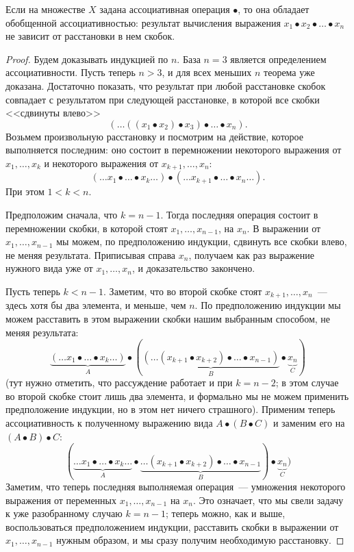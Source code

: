 \begin{theorem}
Если на множестве $X$ задана ассоциативная операция $\bullet$, то она
обладает обобщенной ассоциативностью: результат вычисления выражения
$x_1\bullet x_2\bullet\dots\bullet x_n$ не зависит от расстановки в
нем скобок.
\end{theorem}
\begin{proof}
Будем доказывать индукцией по $n$. База $n=3$ является определением
ассоциативности. Пусть теперь $n>3$, и для всех меньших $n$ теорема
уже доказана.
Достаточно показать, что результат при любой расстановке скобок
совпадает с результатом при следующей расстановке, в которой все скобки
<<сдвинуты влево>>
$$
(\dots ((x_1\bullet x_2)\bullet x_3)\bullet\dots\bullet x_n).
$$
Возьмем произвольную расстановку и посмотрим на действие, которое
выполняется последним: оно состоит в перемножении некоторого выражения
от $x_1,\dots,x_k$ и некоторого выражения от $x_{k+1},\dots,x_n$:
$$
(\dots x_1\bullet\dots\bullet x_k\dots) \bullet
(\dots x_{k+1}\bullet\dots\bullet x_n\dots).
$$
При этом $1 < k < n$.

Предположим сначала, что $k = n-1$. Тогда последняя операция состоит в
перемножении скобки, в которой стоят $x_1,\dots,x_{n-1}$, на $x_n$. В
выражении от $x_1,\dots,x_{n-1}$ мы можем, по предположению индукции,
сдвинуть все скобки влево, не меняя результата. Приписывая справа
$x_n$, получаем как раз выражение нужного вида уже от
$x_1,\dots,x_n$, и доказательство закончено.

Пусть теперь $k<n-1$. Заметим, что во второй скобке стоят
$x_{k+1},\dots,x_n$~--- здесь хотя бы два элемента, и меньше, чем
$n$. По предположению индукции мы можем расставить в этом выражении
скобки нашим выбранным способом, не меняя результата:
$$
\underbrace{\left(\dots x_1\bullet\dots\bullet x_k\dots\right)}_{A} \bullet
(\underbrace{(\dots (x_{k+1}\bullet x_{k+2})\bullet\dots\bullet x_{n-1})}_B\bullet\underbrace{x_n}_C)
$$
(тут нужно отметить, что рассуждение работает и при $k=n-2$; в этом
случае во второй скобке стоит лишь два элемента, и формально мы не
можем применить предположение индукции, но в этом нет ничего страшного).
Применим теперь ассоциативность к полученному выражению вида
$A\bullet (B\bullet C)$ и заменим его на $(A\bullet B)\bullet C$:
$$
(\underbrace{\dots x_1\bullet\dots\bullet x_k\dots}_{A} \bullet
\underbrace{\dots (x_{k+1}\bullet x_{k+2})\bullet\dots\bullet x_{n-1}}_B)\bullet\underbrace{x_n}_C)
$$
Заметим, что теперь последняя выполняемая операция~--- умножения
некоторого выражения от переменных $x_1,\dots,x_{n-1}$ на $x_n$. Это
означает,
что мы свели задачу к уже разобранному случаю $k=n-1$; теперь можно,
как и выше, воспользоваться предположением индукции, расставить скобки
в выражении от $x_1,\dots,x_{n-1}$ нужным образом, и мы сразу получим
необходимую расстановку.
\end{proof}

